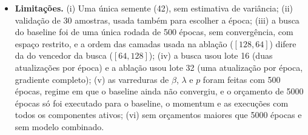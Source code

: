 \documentclass[11pt,a4paper]{article}
\begin{document}
\begin{itemize}
\item \textbf{Limitações.} (i) Uma única semente (42), sem estimativa de variância; (ii) validação de 30 amostras, usada também para escolher a época; (iii) a busca do baseline foi de uma única rodada de 500 épocas, sem convergência, com espaço restrito, e a ordem das camadas usada na ablação ($[128,64]$) difere da do vencedor da busca ($[64,128]$); (iv) a busca usou lote 16 (duas atualizações por época) e a ablação usou lote 32 (uma atualização por época, gradiente completo); (v) as varreduras de $\beta$, $\lambda$ e $p$ foram feitas com 500 épocas, regime em que o baseline ainda não convergiu, e o orçamento de 5000 épocas só foi executado para o baseline, o momentum e as execuções com todos os componentes ativos; (vi) sem orçamentos maiores que 5000 épocas e sem modelo combinado.
\end{itemize}
\end{document}
